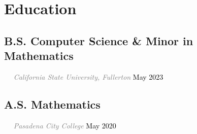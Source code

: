 \documentclass{article}
\newcommand{\resumesection}[3]{
    \subsection*{#1}
    \ 
    \ 
    \small
    \textcolor{grey}{\emph{#2}}
    \normalsize
    \hfill
    \textcolor{black}{#3}
    \normalsize
}
\begin{document}
\pagestyle{useheader}
\section*{Education}
\resumesection{B.S. Computer Science \& Minor in Mathematics}{California State University, Fullerton}{May 2023}%
\resumesection{A.S. Mathematics}{Pasadena City College}{May 2020}
\end{document}
